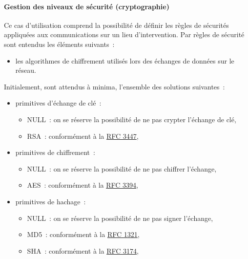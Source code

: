 \paragraph{Gestion des niveaux de sécurité (cryptographie)}
Ce cas d'utilisation comprend la possibilité de définir les règles de sécurités appliquées aux communications sur un lieu d'intervention. Par règles de sécurité sont entendus les éléments suivants~:
\begin{itemize}
	\item les algorithmes de chiffrement utilisés lors des échanges de données sur le réseau.
\end{itemize}
Initialement, sont attendus à minima, l'ensemble des solutions suivantes~:
\begin{itemize}
	\item primitives d'échange de clé~:
	\begin{itemize}
		\item NULL~: on se réserve la possibilité de ne pas crypter l'échange de clé,
		\item RSA~: conformément à la \href{http://tools.ietf.org/html/rfc3447}{RFC 3447},
	\end{itemize}
	\item primitives de chiffrement~:
	\begin{itemize}
		\item NULL~: on se réserve la possibilité de ne pas chiffrer l'échange,
		\item AES~: conformément à la \href{http://tools.ietf.org/html/rfc3394}{RFC 3394},
	\end{itemize}
	\item primitives de hachage~:
	\begin{itemize}
		\item NULL~: on se réserve la possibilité de ne pas signer l'échange,
		\item MD5~: conformément à la \href{http://tools.ietf.org/html/rfc1321}{RFC 1321},
		\item SHA~: conformément à la \href{http://tools.ietf.org/html/rfc3174}{RFC 3174},
	\end{itemize}
\end{itemize}

